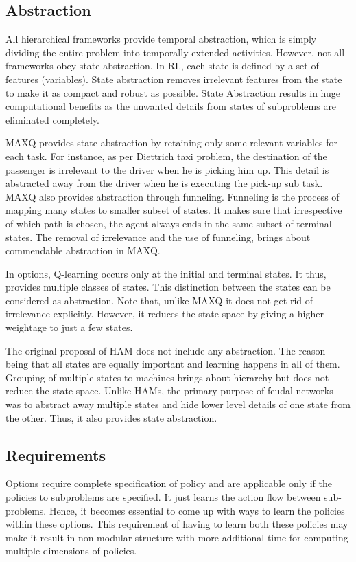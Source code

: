 \subsection{Abstraction}

All hierarchical frameworks provide temporal abstraction, which is simply dividing the entire problem into temporally extended activities. However, not all frameworks obey state abstraction. In RL, each state is defined by a set of features (variables). State abstraction removes irrelevant features from the state to make it as compact and robust as possible. State Abstraction results in huge computational benefits as the unwanted details from states of subproblems are eliminated completely. 

MAXQ provides state abstraction by retaining only some relevant variables for each task. For instance, as per Diettrich taxi problem, the destination of the passenger is irrelevant to the driver when he is picking him up. This detail is abstracted away from the driver when he is executing the pick-up sub task. MAXQ also provides abstraction through funneling. Funneling is the process of mapping many states to smaller subset of states. It makes sure that irrespective of which path is chosen, the agent always ends in the same subset of terminal states. The removal of irrelevance and the use of funneling, brings about commendable abstraction in MAXQ.

In options, Q-learning occurs only at the initial and terminal states. It thus, provides multiple classes of states. This distinction between the states can be considered as abstraction. Note that, unlike MAXQ it does not get rid of irrelevance explicitly. However, it reduces the state space by giving a higher weightage to just a few states. 

The original proposal of HAM does not include any abstraction. The reason being that all states are equally important and learning happens in all of them. Grouping of multiple states to machines brings about hierarchy but does not reduce the state space. Unlike HAMs, the primary purpose of feudal networks was to abstract away multiple states and hide lower level details of one state from the other. Thus, it also provides state abstraction. 


\subsection{Requirements}

Options require complete specification of policy and are applicable only if the policies to subproblems are specified. It just learns the action flow between sub-problems. Hence, it becomes essential to come up with ways to learn the policies within these options.  This requirement of having to learn both these policies may make it result in non-modular structure with more additional time for computing multiple dimensions of policies. 

